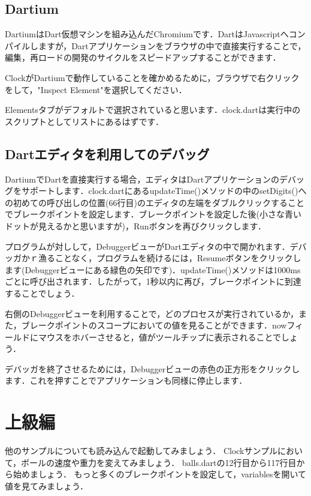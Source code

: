 
\subsection{Dartium}

DartiumはDart仮想マシンを組み込んだChromiumです．DartはJavascriptへコンパイルしますが，Dartアプリケーションをブラウザの中で直接実行することで，編集，再ロードの開発のサイクルをスピードアップすることができます．

ClockがDartiumで動作していることを確かめるために，ブラウザで右クリックをして，"Inspect Element"を選択してください．


Elementsタブがデフォルトで選択されていると思います．clock.dartは実行中のスクリプトとしてリストにあるはずです．


\subsection{Dartエディタを利用してのデバッグ}

DartiumでDartを直接実行する場合，エディタはDartアプリケーションのデバッグをサポートします．clock.dartにあるupdateTime()メソッドの中のsetDigits()への初めての呼び出しの位置(66行目)のエディタの左端をダブルクリックすることでブレークポイントを設定します．ブレークポイントを設定した後(小さな青いドットが見えるかと思いますが)，Runボタンを再びクリックします．


プログラムが対しして，DebuggerビューがDartエディタの中で開かれます．デバッガかｒ漁ることなく，プログラムを続けるには，Resumeボタンをクリックします(Debuggerビューにある緑色の矢印です)．updateTime()メソッドは1000msごとに呼び出されます．したがって，1秒以内に再び，ブレークポイントに到達することでしょう．


右側のDebuggerビューを利用することで，どのプロセスが実行されているか，また，ブレークポイントのスコープにおいての値を見ることができます．nowフィールドにマウスをホバーさせると，値がツールチップに表示されることでしょう．


デバッガを終了させるためには，Debuggerビューの赤色の正方形をクリックします．これを押すことでアプリケーションも同様に停止します．


\section{上級編}

他のサンプルについても読み込んで起動してみましょう．
Clockサンプルにおいて，ボールの速度や重力を変えてみましょう．
balls.dartの12行目から117行目から始めましょう．
もっと多くのブレークポイントを設定して，variablesを開いて値を見てみましょう．


\clearpage
